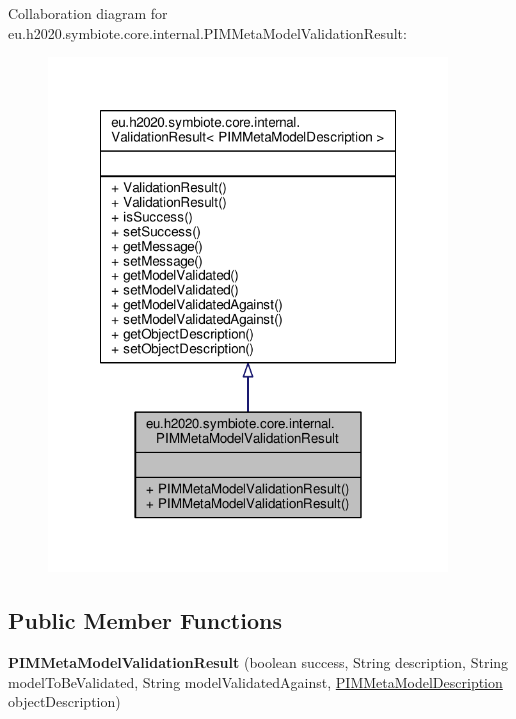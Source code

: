 Collaboration diagram for eu.\+h2020.\+symbiote.\+core.\+internal.\+P\+I\+M\+Meta\+Model\+Validation\+Result\+:
\nopagebreak
\begin{figure}[H]
\begin{center}
\leavevmode
\includegraphics[width=300pt]{classeu_1_1h2020_1_1symbiote_1_1core_1_1internal_1_1PIMMetaModelValidationResult__coll__graph}
\end{center}
\end{figure}
\subsection*{Public Member Functions}
\begin{DoxyCompactItemize}
\item 
\mbox{\label{classeu_1_1h2020_1_1symbiote_1_1core_1_1internal_1_1PIMMetaModelValidationResult_af9de2aa91d73725fa048646328e7a8de}} 
{\bfseries P\+I\+M\+Meta\+Model\+Validation\+Result} (boolean success, String description, String model\+To\+Be\+Validated, String model\+Validated\+Against, \hyperlink{classeu_1_1h2020_1_1symbiote_1_1core_1_1internal_1_1PIMMetaModelDescription}{P\+I\+M\+Meta\+Model\+Description} object\+Description)
\end{DoxyCompactItemize}


